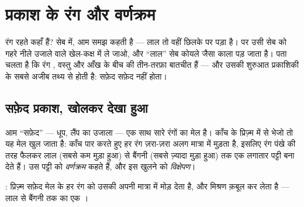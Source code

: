 \chapter{प्रकाश के रंग और वर्णक्रम}\label{ch:g8:colors-spectra}

रंग रहते कहाँ हैं? सेब में, आम समझ कहती है --- लाल तो वहीं छिलके पर
पड़ा है। पर उसी सेब को गहरे नीले उजाले वाले खेल-कक्ष में ले जाओ, और
``लाल'' सेब कोयले जैसा काला पड़ जाता है। पता चलता है कि रंग ,
वस्तु और आँख के बीच की तीन-तरफ़ा बातचीत हैं --- और उसकी शुरुआत
प्रकाशिकी के सबसे अजीब तथ्य से होती है: सफ़ेद  सफ़ेद नहीं होता।

\section{सफ़ेद प्रकाश, खोलकर देखा हुआ}

\begin{proposition}[सफ़ेद प्रकाश एक मिश्रण है]\label{prop:g8:colors-spectra:mixture}
आम ``सफ़ेद''  --- धूप, लैंप का उजाला --- एक साथ सारे रंगों का
मेल है। काँच के प्रिज़्म में से भेजो तो यह मेल खुल जाता है: काँच पार
करते हुए हर रंग ज़रा-ज़रा अलग मात्रा में मुड़ता है, इसलिए रंग पंखे की
तरह फैलकर लाल (सबसे कम मुड़ा हुआ) से बैंगनी (सबसे ज़्यादा मुड़ा हुआ)
तक एक लगातार पट्टी बना देते हैं। उस पट्टी को
\emph{वर्णक्रम} कहते हैं, और इस खुलने को
\emph{विक्षेपण}।
\end{proposition}

\begin{omfigure}

{\small {}: प्रिज़्म सफ़ेद मेल के हर रंग को उसकी अपनी मात्रा में
मोड़ देता है, और मिश्रण क़बूल कर लेता है --- लाल से बैंगनी तक का एक
।}
\end{omfigure}

